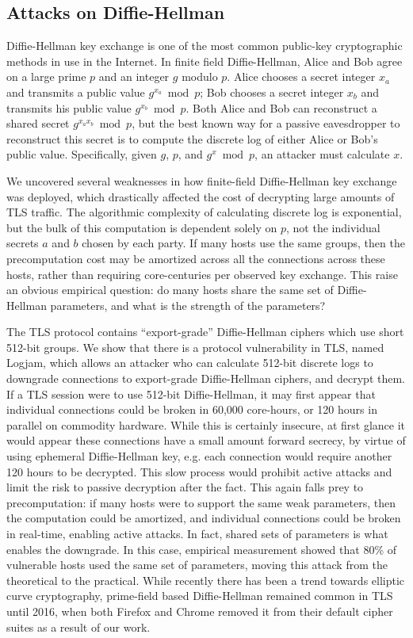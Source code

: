 \subsection{Attacks on Diffie-Hellman}

Diffie-Hellman key exchange is one of the most common public-key
cryptographic methods in use in the Internet. In finite field Diffie-Hellman,
Alice and Bob agree on a large prime $p$ and an integer $g$ modulo $p$. Alice
chooses a secret integer $x_a$ and transmits a public value $g^{x_a} \bmod
p$; Bob chooses a secret integer $x_b$ and transmits his public value
$g^{x_b} \bmod p$. Both Alice and Bob can reconstruct a shared secret $g^{x_a
x_b} \bmod p$, but the best known way for a passive eavesdropper to
reconstruct this secret is to compute the discrete log of either Alice or
Bob's public value. Specifically, given $g$, $p$, and $g^x \bmod p$, an
attacker must calculate $x$.

We uncovered several weaknesses in how finite-field Diffie-Hellman key
exchange was deployed, which drastically affected the cost of decrypting
large amounts of TLS traffic. The algorithmic complexity of calculating
discrete log is exponential, but the bulk of this computation is dependent
solely on $p$, not the individual secrets $a$ and $b$ chosen by each party.
If many hosts use the same groups, then the precomputation cost may be
amortized across all the connections across these hosts, rather than
requiring core-centuries per observed key exchange. This raise an obvious
empirical question: do many hosts share the same set of Diffie-Hellman
parameters, and what is the strength of the parameters?

The TLS protocol contains ``export-grade'' Diffie-Hellman ciphers which use
short 512-bit groups. We show that there is a protocol vulnerability in TLS,
named Logjam, which allows an attacker who can calculate 512-bit discrete logs
to downgrade connections to export-grade Diffie-Hellman ciphers, and decrypt
them. If a TLS session were to use 512-bit Diffie-Hellman, it may first appear
that individual connections could be broken in 60,000 core-hours, or 120 hours
in parallel on commodity hardware. While this is certainly insecure, at first
glance it would appear these connections have a small amount forward secrecy,
by virtue of using ephemeral Diffie-Hellman key, e.g. each connection would
require another 120 hours to be decrypted. This slow process would prohibit
active attacks and limit the risk to passive decryption after the fact. This
again falls prey to precomputation: if many hosts were to support the same weak
parameters, then the computation could be amortized, and individual connections
could be broken in real-time, enabling active attacks. In fact, shared sets of
parameters is what enables the downgrade. In this case, empirical measurement
showed that 80\% of vulnerable hosts used the same set of parameters, moving
this attack from the theoretical to the practical. While recently there has
been a trend towards elliptic curve cryptography, prime-field based
Diffie-Hellman remained common in TLS until 2016, when both Firefox and Chrome
removed it from their default cipher suites as a result of our work.

